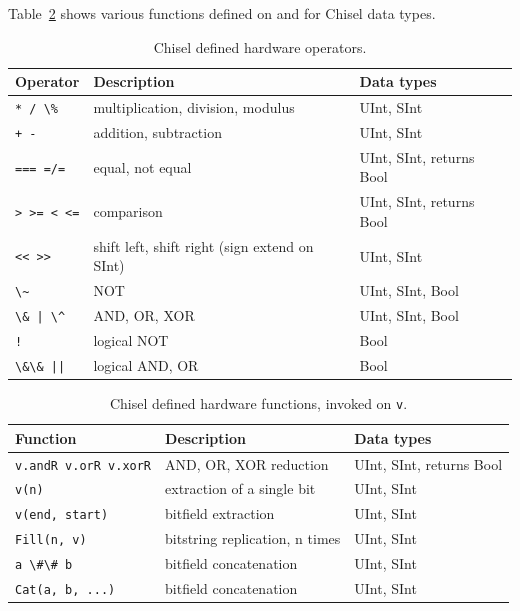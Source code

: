 \documentclass[%
    10pt,
    headinclude, footexclude,
    openright, %
    notitlepage,
    cleardoubleempty,
    headsepline,
    pointlessnumbers,
    bibtotoc, idxtotoc,
    ]{scrbook}
\newcommand{\code}[1]{{\lstinline[basicstyle=\small\ttfamily]{#1}}}
\begin{document}
Table~\ref{tab:functions} shows various functions defined on and for Chisel data types.

\begin{table}
 \centering
  \begin{tabular}{lll}
    \toprule
    Operator & Description & Data types \\
    \midrule
    \code{* / \%} & multiplication, division, modulus & UInt, SInt \\
    \code{+ -} & addition, subtraction & UInt, SInt \\
    \code{=== =/=} & equal, not equal & UInt, SInt, returns Bool \\
    \code{> >= < <=} & comparison & UInt, SInt, returns Bool \\
    \code{<< >>} & shift left, shift right (sign extend on SInt) & UInt, SInt \\
    \code{\~} & NOT & UInt, SInt, Bool \\
    \code{\& | \^} & AND, OR, XOR & UInt, SInt, Bool \\
    \code{!} & logical NOT & Bool \\
    \code{\&\& ||} & logical AND, OR & Bool \\
    \bottomrule
  \end{tabular}
  \caption{Chisel defined hardware operators.}
 \label{tab:operators}
\end{table}


\begin{table}
 \centering
  \begin{tabular}{lll}
    \toprule
    Function & Description & Data types \\
    \midrule
    \code{v.andR v.orR v.xorR} & AND, OR, XOR reduction & UInt, SInt, returns Bool \\
    \code{v(n)} & extraction of a single bit & UInt, SInt \\
    \code{v(end, start)} & bitfield extraction & UInt, SInt \\
    \code{Fill(n, v)} & bitstring replication, n times & UInt, SInt \\
    \code{a \#\# b} & bitfield concatenation & UInt, SInt \\
    \code{Cat(a, b, ...)} & bitfield concatenation & UInt, SInt \\
    \bottomrule
  \end{tabular}
  \caption{Chisel defined hardware functions, invoked on \code{v}.}
   \label{tab:functions}
\end{table}
\end{document}
